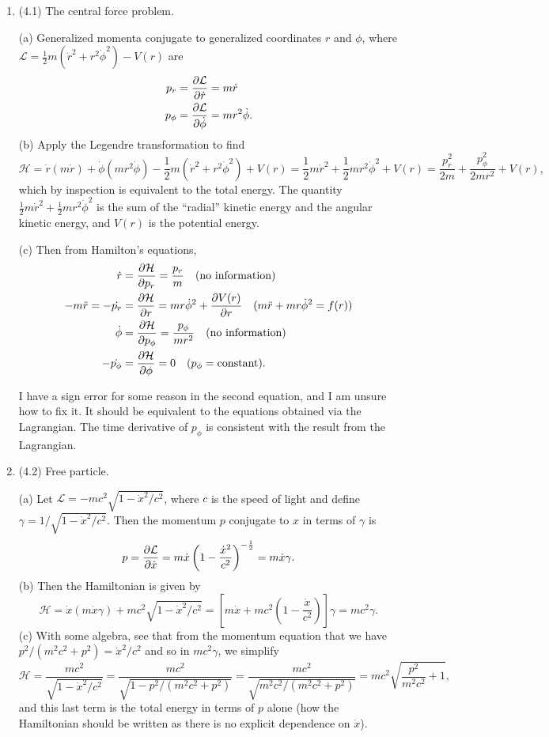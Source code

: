 \documentclass[11pt]{article}
\newcommand{\br}[1]{\left(#1\right)}
\newcommand{\sbr}[1]{\left[#1\right]}
\begin{document}
\begin{enumerate}
    \item (4.1) The central force problem.
    
    (a) Generalized momenta conjugate to generalized coordinates $r$ and $\phi$, where $\mathcal{L} = \frac{1}{2}m\left(\dot{r}^2+r^2\dot{\phi}^2\right) - V(r)$ are
    \begin{align*}
        p_r &= \pdv{\mathcal{L}}{\dot{r}} = m\dot{r}\\
        p_{\phi} &= \pdv{\mathcal{L}}{\dot{\phi}} = mr^2\dot{\phi}.
    \end{align*}
    (b) Apply the Legendre transformation to find \[\mathcal{H} = \dot{r}\br{m\dot{r}} + \dot{\phi}\br{mr^2\dot{\phi}} - \frac{1}{2}m\left(\dot{r}^2+r^2\dot{\phi}^2\right) + V(r) = \frac{1}{2}m\dot{r}^2 + \frac{1}{2}mr^2\dot{\phi}^2 + V(r) = \frac{p_r^2}{2m}+ \frac{p_{\phi}^2}{2mr^2} + V(r),\] which by inspection is equivalent to the total energy. The quantity $\frac{1}{2}m\dot{r}^2 + \frac{1}{2}mr^2\dot{\phi}^2$ is the sum of the ``radial'' kinetic energy and the angular kinetic energy, and $V(r)$ is the potential energy.

    (c) Then from Hamilton's equations, \begin{align*}
        \dot{r} &= \pdv{\mathcal{H}}{p_r} = \frac{p_r}{m} \quad (\text{no information})\\
        -m\ddot{r} = -\dot{p_r} &= \pdv{\mathcal{H}}{r} = mr\dot{\phi}^2 + \pdv{V(r)}{r} \quad (m\ddot{r} + mr\dot{\phi}^2 = f(r))\\
        \dot{\phi} &= \pdv{\mathcal{H}}{p_{\phi}} = \frac{p_{\phi}}{mr^2} \quad (\text{no information})\\
        -\dot{p_{\phi}} &= \pdv{\mathcal{H}}{\phi} = 0 \quad (p_{\phi} = \text{constant}).
    \end{align*}

    I have a sign error for some reason in the second equation, and I am unsure how to fix it. It should be equivalent to the equations obtained via the Lagrangian. The time derivative of $p_{\phi}$ is consistent with the result from the Lagrangian.

    \item (4.2) Free particle.
    
    (a) Let $\mathcal{L} = -mc^2\sqrt{1-\dot{x}^2/c^2}$, where $c$ is the speed of light and define $\gamma = 1/\sqrt{1-\dot{x}^2/c^2}$. Then the momentum $p$ conjugate to $x$ in terms of $\gamma$ is \[p = \pdv{\mathcal{L}}{\dot{x}} = m\dot{x}\br{1-\frac{\dot{x}^2}{c^2}}^{-\frac{1}{2}} = m\dot{x}\gamma.\]
    (b) Then the Hamiltonian is given by \[\mathcal{H} = \dot{x}\br{m\dot{x}\gamma} + mc^2\sqrt{1-\dot{x}^2/c^2} = \sbr{m\dot{x}+mc^2\br{1-\frac{\dot{x}}{c^2}}}\gamma = mc^2\gamma.\]
    (c) With some algebra, see that from the momentum equation that we have $p^2/(m^2c^2+p^2) = \dot{x}^2/c^2$ and so in $mc^2\gamma$, we simplify \[\mathcal{H} = \frac{mc^2}{\sqrt{1-\dot{x}^2/c^2}} = \frac{mc^2}{\sqrt{1-p^2/(m^2c^2+p^2)}} = \frac{mc^2}{\sqrt{m^2c^2/(m^2c^2+p^2)}} = mc^2\sqrt{\frac{p^2}{m^2c^2}+1},\] and this last term is the total energy in terms of $p$ alone (how the Hamiltonian should be written as there is no explicit dependence on $\dot{x}$).
\end{enumerate}
\end{document}
